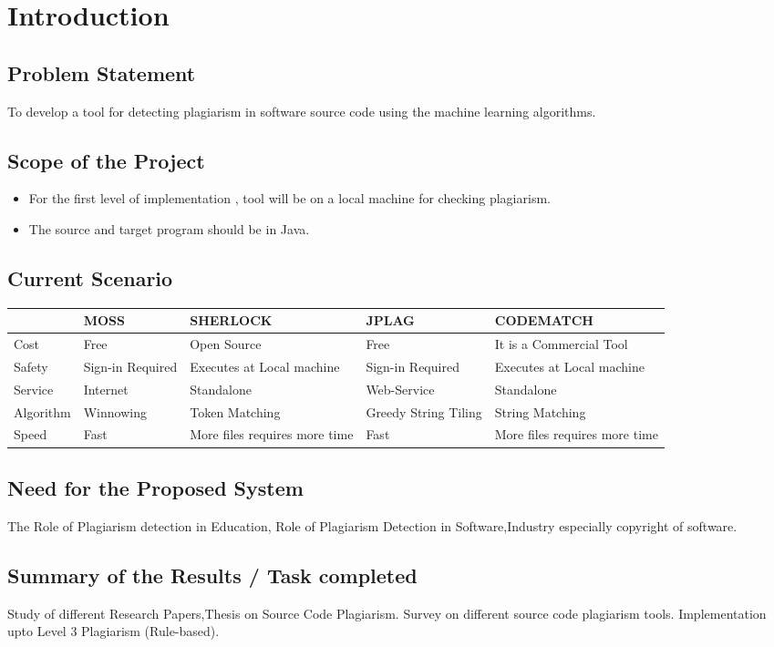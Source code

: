 \chapter{Introduction}
 \section{Problem Statement}

To develop a tool for detecting plagiarism in software source code using
the machine learning algorithms.
 \section{Scope of the Project}

 \begin{itemize}
\item For the first level of implementation , tool will be on a local machine for
checking plagiarism.
\item The source and target program should be in Java.
 \end{itemize}
 \section{Current Scenario}
\begin{table}[]
\centering
\begin{tabular}{|m{3cm}|m{3cm}|m{3cm}|m{3cm}|m{3cm}|}
\hline
          & MOSS             & SHERLOCK                      & JPLAG                & CODEMATCH                     \\ \hline
Cost      & Free             & Open Source                   & Free                 & It is a Commercial Tool       \\ \hline
Safety    & Sign-in Required & Executes at Local machine     & Sign-in Required     & Executes at Local machine     \\ \hline
Service   & Internet         & Standalone                    & Web-Service          & Standalone                    \\ \hline
Algorithm & Winnowing         & Token Matching                & Greedy String Tiling & String Matching               \\ \hline
Speed     & Fast             & More files requires more time & Fast                 & More files requires more time \\ \hline
\end{tabular}
\end{table}
 \section{Need for the Proposed System}
The Role of Plagiarism detection in Education, Role of Plagiarism Detection in Software,Industry especially copyright of software.
 \section{Summary of the Results / Task completed }
Study of different Research Papers,Thesis on Source Code Plagiarism.
Survey on different source code plagiarism tools.
Implementation upto Level 3 Plagiarism (Rule-based).
